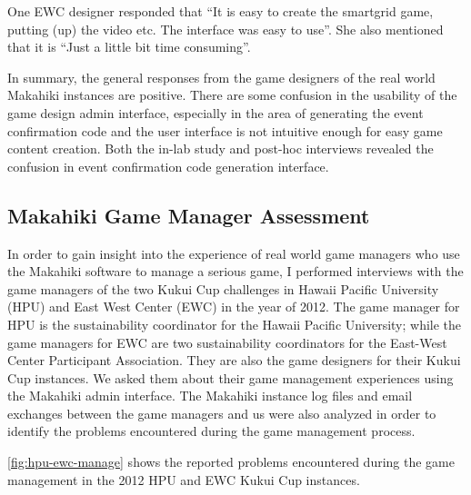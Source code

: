 One EWC designer responded that ``It is easy to create the smartgrid game, putting (up) the video etc. The interface was easy to use''. She also mentioned that it is ``Just a little bit time consuming''.

In summary, the general responses from the game designers of the real world Makahiki instances are positive. There are some confusion in the usability of the game design admin interface, especially in the area of generating the event confirmation code and the user interface is not intuitive enough for easy game content creation. Both the in-lab study and post-hoc interviews revealed the confusion in event confirmation code generation interface.

\subsection{Makahiki Game Manager Assessment}
\label{sec:manager-interview-result} 

In order to gain insight into the experience of real world game managers who use the Makahiki software to manage a serious game, I performed interviews with the game managers of the two Kukui Cup challenges in Hawaii Pacific University (HPU) and East West Center (EWC) in the year of 2012. The game manager for HPU is the sustainability coordinator for the Hawaii Pacific University; while the game managers for EWC are two sustainability coordinators for the East-West Center Participant Association. They are also the game designers for their Kukui Cup instances. We asked them about their game management experiences using the Makahiki admin
interface. The Makahiki instance log files and email exchanges between the game managers and us were also analyzed in order to identify the problems encountered during the game management process.

\autoref{fig:hpu-ewc-manage} shows the reported problems encountered during the game management in the 2012 HPU and  EWC Kukui Cup instances. 

